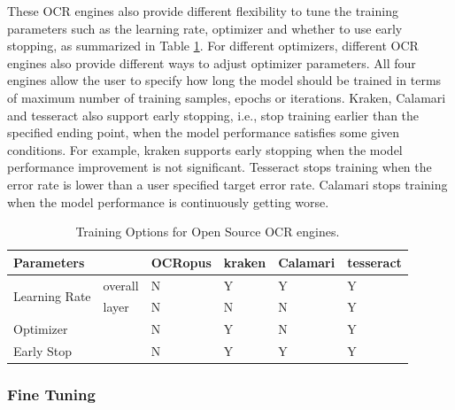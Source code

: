 \documentclass[conference]{IEEEtran}
\begin{document}
These OCR engines also provide different flexibility to tune the training
parameters such as the learning rate, optimizer and whether to use early
stopping, as summarized in Table \ref{tab:training_options}. For different
optimizers, different OCR engines also provide different ways to adjust
optimizer parameters. All four engines allow the user to specify how long the
model should be trained in terms of maximum number of training samples, epochs
or iterations. Kraken, Calamari and tesseract also support early stopping,
i.e., stop training earlier than the specified ending point, when the model
performance satisfies some given conditions. For example, kraken supports early
stopping when the model performance improvement is not significant. Tesseract
stops training when the error rate is lower than a user specified target error
rate. Calamari stops training when the model performance is continuously
getting worse.

\begin{table}[bt]
\begin{tabular}{llllll}
\hline
Parameters                     &         & OCRopus & kraken & Calamari & tesseract \\ \hline
\multirow{2}{*}{Learning Rate} & overall & N       & Y      & Y        & Y         \\
                               & layer   & N       & N      & N        & Y         \\
\hline
Optimizer                      &         & N       & Y      & N        & Y         \\ \hline
Early Stop                     &         & N       & Y      & Y        & Y         \\
\end{tabular}
\caption{Training Options for Open Source OCR engines.}
\label{tab:training_options}
\end{table}
\subsubsection*{Fine Tuning}
\end{document}
